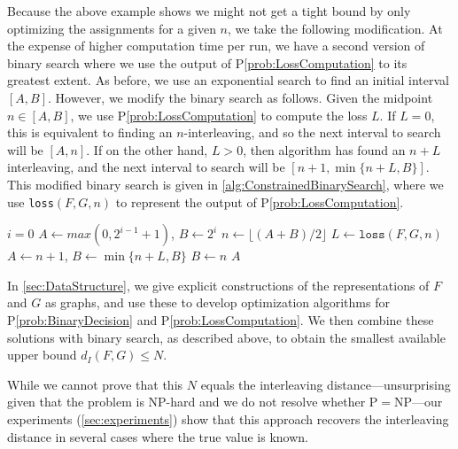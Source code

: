 Because the above example shows we might not get a tight bound by only optimizing the assignments for a given $n$, we take the following modification. 
At the expense of higher computation time per run, we have a second version of binary search where we use the output of P\ref{prob:LossComputation} to its greatest extent. 
As before, we use an exponential search to find an initial interval $[A,B]$. 
However, we modify the binary search as follows. 
Given the midpoint $n \in [A,B]$, we use P\ref{prob:LossComputation} to compute the loss $L$. 
If $L =0$, this is equivalent to finding an $n$-interleaving, and so the next interval to search will be $[A,n]$. 
If on the other hand, $L>0$, then algorithm has found an $n+L$ interleaving, and the next interval to search will be $[n+1, \min\{n+L, B\}]$. 
This modified binary search is given in \cref{alg:ConstrainedBinarySearch}, where we use \texttt{loss}$(F,G,n)$ to represent the output of P\ref{prob:LossComputation}. 

\begin{algorithm}
\caption{Constrained Binary Search For $N$}
\label{alg:ConstrainedBinarySearch}
\begin{algorithmic}[1]
    \State $i=0$
    \EndWhile
    \State $A \gets max(0,2^{i-1}+1)$, $B \gets 2^i$
        \State $n \gets \lfloor (A + B) / 2 \rfloor$
        \State $L \gets \texttt{loss}(F,G,n)$
            \State $A \gets n+1$, $B \gets \min\{n+L, B\}$ 
        \Else {}
            \State  $B \gets n$ 
        \EndIf
    \EndWhile
    \State \Return $A$ 
\EndProcedure
\end{algorithmic}
\end{algorithm}

In \cref{sec:DataStructure}, we give explicit constructions of the representations of $F$ and $G$ as graphs, and use these to develop optimization algorithms for P\ref{prob:BinaryDecision} and P\ref{prob:LossComputation}. We then combine these solutions with binary search, as described above, to obtain the smallest available upper bound $d_I(F,G) \leq N$.

While we cannot prove that this $N$ equals the interleaving distance---unsurprising given that the problem is NP-hard and we do not resolve whether $\mathrm{P}=\mathrm{NP}$---our experiments (\cref{sec:experiments}) show that this approach recovers the interleaving distance in several cases where the true value is known.

